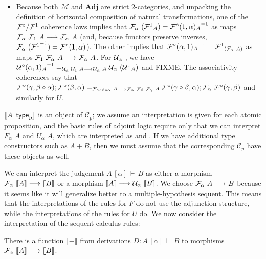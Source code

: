 \documentclass{drl-common/llncs}
\renewcommand{\sem}[1]{\ensuremath{ \llbracket #1 \rrbracket}}
\newcommand{\inv}[1]{\ensuremath{{#1}^{-1}}}
\newcommand{\C}{\ensuremath{\mathcal{C}}}
\newcommand{\M}{\ensuremath{\mathcal{M}}}
\newcommand{\arrow}[3]{\ensuremath{#2 \longrightarrow_{#1} #3}}
\newcommand{\Adj}{\textbf{Adj}}
\newcommand\compo[2]{\ensuremath{#1 \circ #2}}
\renewcommand\wftp[2]{\ensuremath{#1 \,\,\, \dsd{type}_{#2}}}
\newcommand\F[2]{\ensuremath{F_{#1} \,\, #2}}
\newcommand\U[2]{\ensuremath{U_{#1} \,\, #2}}
\newcommand\coprd[2]{\ensuremath{#1 + #2}}
\newcommand\seq[3]{\ensuremath{#1 \, [ #2 ] \, \vdash \, #3}}
\begin{document}
\begin{itemize}
\item Because both $\M$ and $\Adj$ are strict 2-categories, and
  unpacking the definition of horizontal composition of natural
  transformations, one of the $\mathcal{F}^\circ/{\mathcal{F}^1}$ coherence laws
  implies that $\semF{\alpha}{(\semFone_A)} = \inv{\semFcomp(1,\alpha)_A}$
  as maps ${\arrow{}{\semF{\alpha}{\semF{1}{A}}}{\semF{\alpha}{A}}}$
  (and, because functors preserve inverses,
  $\semF{\alpha}{(\inv{\semFone})} = {\semFcomp(1,\alpha)}$).  The other
  implies that $\inv{\semFcomp(\alpha,1)_{A}} =
  \semFone_{(\semF{\alpha}{A})}$  as maps
  $\arrow{}{\semF{1}{\semF{\alpha}{A}}}{\semF{\alpha}{A}}$.  
   For $\mathcal{U}_{\alpha} \,\, $, we have
  $\inv{\semUcomp(\alpha,1)_A} =_{\arrow{}{\semU{\alpha}{\semU{1}{A}}}{\semU{\alpha}{A}}} \semU{\alpha}{(\semUone_A)}$
  and FIXME.
  The associativity coherences say that
  $\semFcomp(\gamma,\compo{\beta}{\alpha});\semFcomp(\beta,\alpha)
  =_{\arrow{}{\semF{\compo{\gamma}{\compo{\beta}{\alpha}}}{A}}{\semF{\alpha}{\semF{\beta}{\semF{\gamma}{A}}}}}
  \semFcomp(\compo{\gamma}{\beta},\alpha);\semF{\alpha}{\semFcomp(\gamma,\beta)}$
  and similarly for $U$.  

\end{itemize}

\sem{\wftp{A}{p}} is an object of $\C_p$; we assume an interpretation is
given for each atomic proposition, and the basic rules of adjoint logic
require only that we can interpret \F{\alpha}{A} and \U{\alpha}{A},
which are interpreted as \semF{\alpha}{\sem{A}} and
\semU{\alpha}{\sem{A}}. If we have additional type constructors such as
\coprd{A}{B}, then we must assume that the corresponding $\C_p$ have
these objects as well.  

We can interpret the judgement \seq{A}{\alpha}{B} as either a morphism
$\arrow{}{\semF \alpha {\sem A}}{\sem B}$ or a morphism $\arrow{}{\sem
  A}{\semU \alpha {\sem B}}$.  We choose $\arrow{}{\semF \alpha A}{B}$
because it seems like it will generalize better to a multiple-hypothesis
sequent.  This means that the interpretations of the rules for $F$ do
not use the adjunction structure, while the interpretations of the rules
for $U$ do.  We now consider the interpretation of the sequent calculus
rules:

\begin{theorem}
There is a function \sem{-} from derivations $D : \seq{A}{\alpha}{B}$ 
to morphisms \arrow{}{\semF \alpha {\sem A}}{\sem B}.
\end{theorem}
\end{document}
